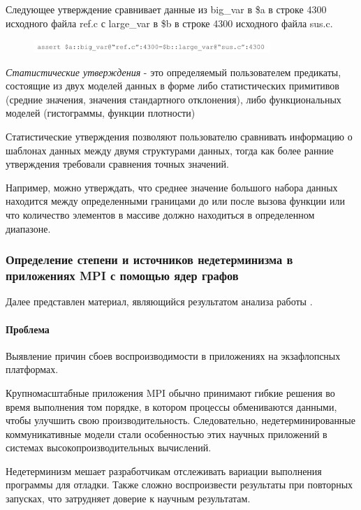 Следующее утверждение сравнивает данные из big_var в \$a в строке 4300 исходного файла ref.c с large_var в \$b в строке 4300 исходного файла \textsf{sus.c}.

\begin{figure}[!ht]
	\includegraphics[width=0.8\textwidth]{ResearchNotes/rndhpc_not_dbg_2021_11_10/assert2.png}
\end{figure}

\textit{Статистические утверждения} - это определяемый пользователем предикаты, состоящие из двух моделей данных в форме либо статистических примитивов (средние значения, значения стандартного отклонения), либо функциональных моделей (гистограммы, функции плотности)

Статистические утверждения позволяют пользователю сравнивать информацию о шаблонах данных между двумя структурами данных, тогда как более ранние утверждения требовали сравнения точных значений.

Например, можно утверждать, что среднее значение большого набора данных находится между определенными границами до или после вызова функции или что количество элементов в массиве должно находиться в определенном диапазоне.

\subsubsection{Определение степени и источников недетерминизма в приложениях MPI с помощью ядер графов}

Далее представлен материал, являющийся результатом анализа работы \cite{Chapp2021}.

\paragraph{Проблема}

Выявление причин сбоев воспроизводимости в приложениях на экзафлопсных платформах.

Крупномасштабные приложения MPI обычно принимают гибкие решения во время выполнения том порядке, в котором процессы обмениваются данными, чтобы улучшить свою производительность. Следовательно, недетерминированные коммуникативные модели стали особенностью этих научных приложений в системах высокопроизводительных вычислений.

Недетерминизм мешает разработчикам отслеживать вариации выполнения программы для отладки. Также сложно воспроизвести результаты при повторных запусках, что затрудняет доверие к научным результатам.

